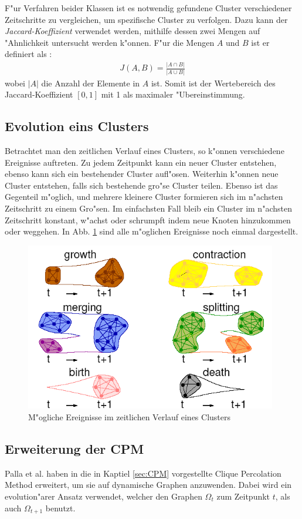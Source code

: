 \documentclass[journal]{vgtc}
\begin{document}
  F"ur Verfahren beider Klassen ist es notwendig gefundene Cluster verschiedener Zeitschritte zu vergleichen, um spezifische Cluster
  zu verfolgen. Dazu kann der \emph{Jaccard-Koeffizient} verwendet werden, mithilfe dessen zwei Mengen auf "Ahnlichkeit
  untersucht werden k"onnen. F"ur die Mengen $A$ und $B$ ist er definiert als \cite{timestep}:
  \begin{align}
    J(A,B)=\frac{|A \cap B|}{|A \cup B|}
  \end{align}
  wobei $|A|$ die Anzahl der Elemente in $A$ ist. Somit ist der Wertebereich des Jaccard-Koeffizient $[0,1]$ mit 1 als maximaler "Ubereinstimmung.
  
  \subsection{Evolution eins Clusters}
    \label{sec:evolution}
    Betrachtet man den zeitlichen Verlauf eines Clusters, so k"onnen verschiedene Ereignisse auftreten. Zu jedem Zeitpunkt kann ein neuer Cluster
    entstehen, ebenso kann sich ein bestehender Cluster aufl"osen. Weiterhin k"onnen neue Cluster entstehen, falls sich bestehende gro"se Cluster
    teilen. Ebenso ist das Gegenteil m"oglich, und mehrere kleinere Cluster formieren sich im n"achsten Zeitschritt zu einem Gro"sen.
    Im einfachsten Fall bleib ein Cluster im n"achsten Zeitschritt konstant, w"achst oder schrumpft indem neue Knoten hinzukommen oder weggehen.
    In Abb. \ref{fig:evolution} sind alle m"oglichen Ereignisse noch einmal dargestellt.
    \begin{figure}[t]
      \centering
      \includegraphics[width=11cm]{images/evolution_alone}
      \caption{M"ogliche Ereignisse im zeitlichen Verlauf eines Clusters \cite{CPM_time}}
      \label{fig:evolution}
    \end{figure}
  \subsection{Erweiterung der CPM}
    \label{sec:CPM_time}
    Palla et al. haben in \cite{CPM_time} die in Kaptiel \ref{sec:CPM} vorgestellte Clique Percolation Method erweitert, um sie auf dynamische
    Graphen anzuwenden. Dabei wird ein evolution"arer Ansatz verwendet, welcher den Graphen $\Omega_{t}$ zum Zeitpunkt $t$, als auch $\Omega_{t+1}$
    benutzt.
    
\end{document}
